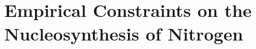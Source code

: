 \documentclass[main.tex]{subfiles}
\begin{document}
\chapter{Empirical Constraints on the Nucleosynthesis of Nitrogen}
\label{ohno}






\end{document}
